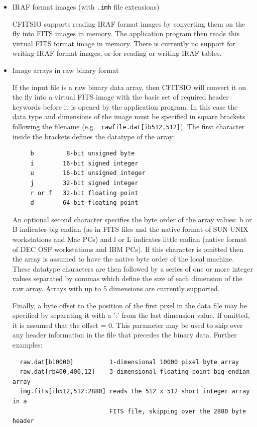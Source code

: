 \documentclass[11pt]{article}
\begin{document}
\begin{itemize}
\item  IRAF format images (with {\tt .imh} file extensions)

CFITSIO supports reading IRAF format images by converting them on the
fly into FITS images in memory.  The application program then reads
this virtual FITS format image in memory.  There is currently no
support for writing IRAF format images, or for reading or writing IRAF
tables.

\item Image arrays in raw binary format

If the input file is a raw binary data array, then CFITSIO will convert
it on the fly into a virtual FITS image with the basic set of required
header keywords before it is opened by the application program.  In
this case the data type and dimensions of the image must be specified
in square brackets following the filename (e.g. {\tt
rawfile.dat[ib512,512]}). The first character inside the brackets
defines the datatype of the array:

\begin{verbatim}
     b         8-bit unsigned byte
     i        16-bit signed integer
     u        16-bit unsigned integer
     j        32-bit signed integer
     r or f   32-bit floating point
     d        64-bit floating point
\end{verbatim}
An optional second character specifies the byte order of the array
values: b or B indicates big endian (as in FITS files and the native
format of SUN UNIX workstations and Mac PCs) and l or L indicates
little endian (native format of DEC OSF workstations and IBM PCs).  If
this character is omitted then the array is assumed to have the native
byte order of the local machine.  These datatype characters are then
followed by a series of one or more integer values separated by commas
which define the size of each dimension of the raw array.  Arrays with
up to 5 dimensions are currently supported.

Finally, a byte offset to the position of the first pixel in the data
file may be specified by separating it with a ':' from the last
dimension value.  If omitted, it is assumed that the offset = 0.  This
parameter may be used to skip over any header information in the file
that precedes the binary data.  Further examples:

\begin{verbatim}
  raw.dat[b10000]          1-dimensional 10000 pixel byte array
  raw.dat[rb400,400,12]    3-dimensional floating point big-endian array
  img.fits[ib512,512:2880] reads the 512 x 512 short integer array in a
                           FITS file, skipping over the 2880 byte header
\end{verbatim}

\end{itemize}
\newpage
\end{document}
